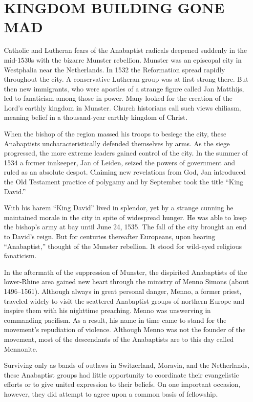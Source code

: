 \section{KINGDOM BUILDING GONE MAD}

Catholic and Lutheran fears of the Anabaptist radicals deepened suddenly in the mid-1530s with the
bizarre Munster rebellion. Munster was an episcopal city in Westphalia near the Netherlands. In 1532
the Reformation spread rapidly throughout the city. A conservative Lutheran group was at first
strong there. But then new immigrants, who were apostles of a strange figure called Jan Matthijs,
led to fanaticism among those in power. Many looked for the creation of the Lord’s earthly kingdom
in Munster. Church historians call such views chiliasm, meaning belief in a thousand-year earthly
kingdom of Christ.

When the bishop of the region massed his troops to besiege the city, these Anabaptists
uncharacteristically defended themselves by arms. As the siege progressed, the more extreme leaders
gained control of the city. In the summer of 1534 a former innkeeper, Jan of Leiden, seized the
powers of government and ruled as an absolute despot. Claiming new revelations from God, Jan
introduced the Old Testament practice of polygamy and by September took the title “King David.”

With his harem “King David” lived in splendor, yet by a strange cunning he maintained morale in the
city in spite of widespread hunger. He was able to keep the bishop’s army at bay until June 24,
1535. The fall of the city brought an end to David’s reign. But for centuries thereafter Europeans,
upon hearing “Anabaptist,” thought of the Munster rebellion. It stood for wild-eyed religious
fanaticism.

In the aftermath of the suppression of Munster, the dispirited Anabaptists of the lower-Rhine area
gained new heart through the ministry of Menno Simons (about 1496–1561). Although always in great
personal danger, Menno, a former priest, traveled widely to visit the scattered Anabaptist groups of
northern Europe and inspire them with his nighttime preaching. Menno was unswerving in commanding
pacifism. As a result, his name in time came to stand for the movement’s repudiation of violence.
Although Menno was not the founder of the movement, most of the descendants of the Anabaptists are
to this day called Mennonite.

Surviving only as bands of outlaws in Switzerland, Moravia, and the Netherlands, these Anabaptist
groups had little opportunity to coordinate their evangelistic efforts or to give united expression
to their beliefs. On one important occasion, however, they did attempt to agree upon a common basis
of fellowship.

